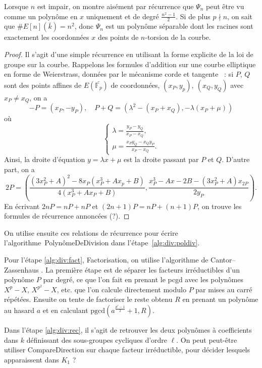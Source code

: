 \documentclass[11pt,a4paper]{article}
\newcommand{\F}{\mathbb{F}}
\theoremstyle{definition}
\begin{document}
Lorsque $n$ est impair, on montre aisément par récurrence que $\Psi_n$ peut être vu comme un polynôme en $x$ uniquement et de degré $\frac{n^2-1}{2}$. Si de plus $p\nmid n$, on sait que $\#E[n](\bar{k})=n^2$, donc $\Psi_n$ est un polynôme séparable dont les racines sont exactement les coordonnées $x$ des points de $n$-torsion de la courbe. 

\begin{proof}
Il s'agit d'une simple récurrence en utilisant la forme explicite de la loi de groupe sur la courbe. Rappelons les formules d'addition sur une courbe elliptique en forme de Weierstrass, données par le mécanisme \og corde et tangente \fg\ : si $P$, $Q$ sont des points affines de $E(\bar{\F_p})$ de coordonnées, $(x_P, y_p),\ (x_Q, y_Q)$ avec $x_P\neq x_Q$, on a
$$-P = (x_P, -y_P),\quad P+Q = (\lambda^2 - (x_P + x_Q), -\lambda(x_P + \mu))$$
où
$$\begin{cases}
\lambda = \frac{y_P - y_Q}{x_P - x_Q},\\
\mu = \frac{x_P y_Q - x_Q y_P}{x_P - x_Q}.
\end{cases}$$
Ainsi, la droite d'équation $y = \lambda x + \mu$ est la droite passant par $P$ et $Q$. D'autre part, on a
$$2P = \left(\frac{(3x_P^2 + A)^2 - 8x_P(x_P^3 + Ax_p + B)}{4(x_P^3+Ax_P+B)},\frac{x_P^3-Ax-2B-(3x_P^2+A)x_{2P}}{2y_P}\right).$$
En écrivant $2nP = nP + nP$ et $(2n+1)P = nP + (n+1) P$, on trouve les formules de récurrence annoncées (?).
\end{proof}

On utilise ensuite ces relations de récurrence pour écrire l'algorithme~{\sc PolynômeDeDivision} dans l'étape~\ref{alg:div:poldiv}.

Pour l'étape \ref{alg:div:fact}, {\sc Factorisation}, on utilise l'algorithme de Cantor--Zassenhaus \cite{vzGG}. La première étape est de séparer les facteurs irréductibles d'un polynôme $P$ par degré, ce que l'on fait en prenant le pcgd avec les polynômes $X^p - X$, $X^{p^2} - X$, etc. que l'on calcule directement modulo $P$ par mises au carré répétées. Ensuite on tente de factoriser le reste obtenu $R$ en prenant un polynôme au hasard $a$ et en calculant $\mathrm{pgcd}(a^{\frac{p^r - 1}{2}} + 1, R)$.

Dans l'étape \ref{alg:div:rec}, il s'agit de retrouver les deux polynômes à coefficients dans $k$ définissant des sous-groupes cycliques d'ordre $\ell$. On peut peut-être utiliser {\sc CompareDirection} sur chaque facteur irréductible, pour décider lesquels apparaissent dans $K_1$ ?
\end{document}
